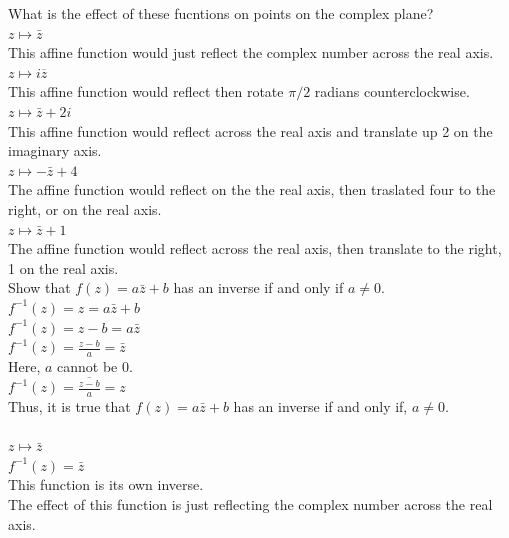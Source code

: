 \documentclass[12pt]{article}
\begin{document}
 What is the effect of these fucntions on points on the complex plane?\\

 $z \mapsto \bar{z}$\\
This affine function would just reflect the complex number across the real axis.\\

 $z \mapsto i\overline{z}$\\
This affine function would reflect then rotate $\pi/2$ radians counterclockwise.\\

 $z \mapsto \bar{z} + 2i$\\
This affine function would reflect across the real axis and translate up 2 on the imaginary axis.\\

 $z \mapsto -\bar{z} + 4$\\
The affine function would reflect on the the real axis, then traslated four to the right, or on the real axis.\\

 $z \mapsto \bar{z} + 1$\\
The affine function would reflect across the real axis, then translate to the right, 1 on the real axis.\\


 Show that $f(z) = a\bar{z} + b$ has an inverse if and only if $a \neq 0$.\\
$f^{-1}(z) = z = a\bar{z} + b$\\
$f^{-1}(z) = z - b = a\bar{z}$\\
$f^{-1}(z) = \frac{z - b}{a} = \bar{z}$\\
Here, $a$ cannot be $0$.\\
$f^{-1}(z) = \overline{\frac{z - b}{a}} = z$\\

Thus, it is true that $f(z) = a\bar{z} + b$ has an inverse if and only if, $a \neq 0$.\\


\\

 $z \mapsto \bar{z}$\\
$f^{-1}(z) = \bar{z}$\\
This function is its own inverse.\\

The effect of this function is just reflecting the complex number across the real axis.\\
\end{document}
